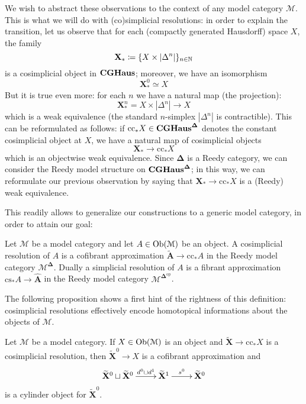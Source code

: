 \begin{refsection}
We wish to abstract these observations to the context of any model category $\mathcal M$. This is what we will do with (co)simplicial resolutions: in order to explain the transition, let us observe that for each (compactly generated Hausdorff) space $X$, the family
\[
\mathbf X_*\coloneqq \{X \times |\Delta^n|\}_{n \in \mathbb{N}}
\]
is a cosimplicial object in $\mathbf{CGHaus}$; moreover, we have an isomorphism
\[
\mathbf X_*^0 \simeq X
\]
But it is true even more: for each $n$ we have a natural map (the projection):
\[
\mathbf X_*^n = X \times |\Delta^n| \to X
\]
which is a weak equivalence (the standard $n$-simplex $|\Delta^n|$ is contractible). This can be reformulated as follows: if $\mathrm{cc}_* X \in \mathbf{CGHaus}^{\mathbf \Delta}$ denotes the constant cosimplicial object at $X$, we have a natural map of cosimplicial objects
\[
\mathbf X_* \to \mathrm{cc}_*X
\]
which is an objectwise weak equivalence. Since $\boldsymbol\Delta$ is a Reedy category, we can consider the Reedy model structure on $\mathbf{CGHaus}^{\boldsymbol\Delta}$; in this way, we can reformulate our previous observation by saying that $\mathbf X_* \to \mathrm{cc}_*X$ is a (Reedy) weak equivalence.

This readily allows to generalize our constructions to a generic model category, in order to attain our goal:

\begin{defin}
Let $\mathcal M$ be a model category and let $A \in \operatorname{Ob}(\mathcal M)$ be an object. A cosimplicial resolution of $A$ is a cofibrant approximation $\widetilde{\mathbf A} \to \mathrm{cc}_* A$ in the Reedy model category $\mathcal M^{\boldsymbol\Delta}$. Dually a simplicial resolution of $A$ is a fibrant approximation $\mathrm{cs}_* A \to \widehat{\mathbf A}$ in the Reedy model category $\mathcal M^{\boldsymbol\Delta^{\mathrm{op}}}$.
\end{defin}

The following proposition shows a first hint of the rightness of this definition: cosimplicial resolutions effectively encode homotopical informations about the objects of $\mathcal M$.

\begin{prop} \label{prop cosimplicial resolution cylinder object}
Let $\mathcal M$ be a model category. If $X \in \operatorname{Ob}(\mathcal M)$ is an object and $\widetilde{\mathbf X} \to \mathrm{cc}_* X$ is a cosimplicial resolution, then $\widetilde{\mathbf X}^0 \to X$ is a cofibrant approximation and
\begin{equation} \label{eq cosimplicial resolution cylinder object}
\xymatrix{
\widetilde{\mathbf X}^0 \sqcup \widetilde{\mathbf X}^0 \ar[r]^-{d^0 \sqcup d^1} & \widetilde{\mathbf X}^1 \ar[r]^{s^0} & \widetilde{\mathbf X}^0
}
\end{equation}
is a cylinder object for $\widetilde{\mathbf X}^0$.
\end{prop}


\end{refsection}
